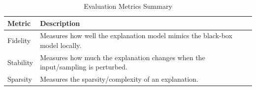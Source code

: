 \begin{table}[htbp]
\centering
\caption{Evaluation Metrics Summary}
\label{tab:metrics}
\begin{tabular}{lp{10cm}}
\toprule
Metric & Description \\
\midrule
Fidelity & Measures how well the explanation model mimics the black-box model locally. \\
Stability & Measures how much the explanation changes when the input/sampling is perturbed. \\
Sparsity & Measures the sparsity/complexity of an explanation. \\
\bottomrule
\end{tabular}
\end{table}